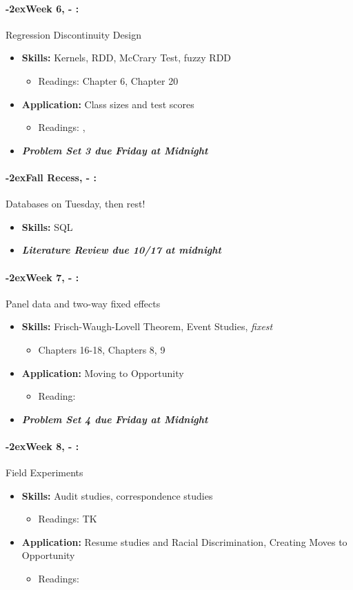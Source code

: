 \documentclass[11pt]{article}
\newcommand{\week}[1]{%
  \paragraph*{\kern-2ex\quad #1, \AdvanceDate[1]\syldate{\today} - \AdvanceDate[2]\syldate{\today}:}%
  \ifdim\wd1=\wd\MONDAY
    \AdvanceDate[7]
  \else
    \AdvanceDate[7]
  \fi%
}
\begin{document}
\week{Week 6} Regression Discontinuity Design
\begin{itemize}
  \item \textbf{Skills:} Kernels, RDD, McCrary Test, fuzzy RDD
  \begin{itemize}
    \item Readings: \cite{cunningham2023mixtape} Chapter 6, \cite{hungtintonklein2023effect} Chapter 20
  \end{itemize}
  \item \textbf{Application:} Class sizes and test scores
  \begin{itemize}
    \item Readings: \textbf{\cite{angrist1999maimonides}}, \cite{chetty2011kindergarten}
  \end{itemize}
  \item \textit{\textbf{Problem Set 3 due Friday at Midnight}}
\end{itemize}
\week{Fall Recess} Databases on Tuesday, then rest!
\begin{itemize}
  \item \textbf{Skills:} SQL
  \item \textit{\textbf{Literature Review due 10/17 at midnight}}
\end{itemize}
\week{Week 7} Panel data and two-way fixed effects
\begin{itemize}
  \item \textbf{Skills:} Frisch-Waugh-Lovell Theorem, Event Studies, \textit{fixest}
  \begin{itemize}
    \item \cite{hungtintonklein2023effect} Chapters 16-18, \cite{cunningham2023mixtape} Chapters 8, 9
  \end{itemize}
  \item \textbf{Application:} Moving to Opportunity
  \begin{itemize}
    \item Reading: \textbf{\cite{chetty2018neighborhoods}}
  \end{itemize}
  \item \textit{\textbf{Problem Set 4 due Friday at Midnight}}
\end{itemize}
\week{Week 8} Field Experiments %
\begin{itemize}
  \item \textbf{Skills:} Audit studies, correspondence studies
  \begin{itemize}
    \item Readings: TK
  \end{itemize}
  \item \textbf{Application:} Resume studies and Racial Discrimination, Creating Moves to Opportunity
  \begin{itemize}
    \item Readings: \cite{bertrand2004emily}
  \end{itemize}
\end{itemize}
\end{document}
